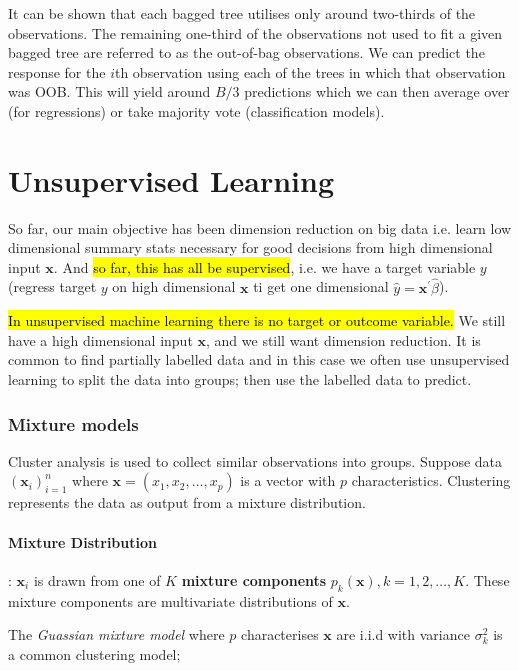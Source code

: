 \documentclass[11pt]{article}
\begin{document}
It can be shown that each bagged tree utilises only around two-thirds of the observations. The remaining one-third of the observations not used to fit a given bagged tree are referred to as the out-of-bag observations. We can predict the response for the $i$th observation using each of the trees in which that observation was OOB. This will yield around $B/3$ predictions which we can then average over (for regressions) or take majority vote (classification models).

\section{Unsupervised Learning}

So far, our main objective has been dimension reduction on big data  i.e. learn low dimensional summary stats necessary for good decisions from high dimensional input $\mathbf{x}$. And \hl{so far, this has all be supervised}, i.e. we have a target variable $y$ (regress target $y$ on high dimensional $\mathbf{x}$ ti get one dimensional $\hat{y} = \mathbf{x}^\prime\hat{\beta}$).

\hl{In unsupervised machine learning there is no target or outcome variable.} We still have a high dimensional input $\mathbf{x}$, and we still want dimension reduction. It is common to find partially labelled data and in this case we often use unsupervised learning to split the data into groups; then use the labelled data to predict.

\subsubsection{Mixture models}

Cluster analysis is used to collect similar observations into groups. Suppose data $(\mathbf{x}_i)_{i=1}^n$ where $\mathbf{x} = (x_1, x_2, \ldots, x_p)$ is a vector with $p$ characteristics. Clustering represents the data as output from a mixture distribution.

\paragraph{Mixture Distribution}: $\mathbf{x}_i$ is drawn from one of $K$ \textbf{mixture components} $p_k(\mathbf{x}), k = 1, 2, \ldots, K$. These mixture components are multivariate distributions of $\mathbf{x}$. 

The \textit{Guassian mixture model} where $p$ characterises $\mathbf{x}$ are i.i.d with variance $\sigma_k^2$ is a common clustering model;
\end{document}
